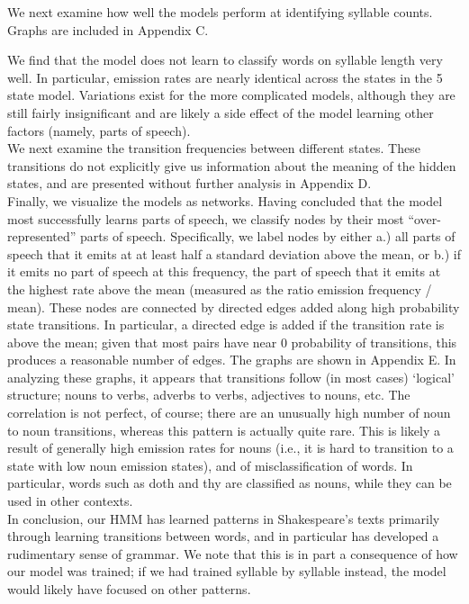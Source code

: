 We next examine how well the models perform at identifying syllable counts. Graphs are included in Appendix C.

We find that the model does not learn to classify words on syllable length very well. In particular, emission rates are nearly identical across the states in the 5 state model. Variations exist for the more complicated models, although they are still fairly insignificant and are likely a side effect of the model learning other factors (namely, parts of speech).\\

We next examine the transition frequencies between different states. These transitions do not explicitly give us information about the meaning of the hidden states, and are presented without further analysis in Appendix D.\\

Finally, we visualize the models as networks. Having concluded that the model most successfully learns parts of speech, we classify nodes by their most ``over-represented'' parts of speech. Specifically, we label nodes by either a.) all parts of speech that it emits at at least half a standard deviation above the mean, or b.) if it emits no part of speech at this frequency, the part of speech that it emits at the highest rate above the mean (measured as the ratio emission frequency / mean). These nodes are connected by directed edges added along high probability state transitions. In particular, a directed edge is added if the transition rate is above the mean; given that most pairs have near 0 probability of transitions, this produces a reasonable number of edges. The graphs are shown in Appendix E.
In analyzing these graphs, it appears that transitions follow (in most cases) `logical' structure; nouns to verbs, adverbs to verbs, adjectives to nouns, etc. The correlation is not perfect, of course; there are an unusually high number of noun to noun transitions, whereas this pattern is actually quite rare. This is likely a result of generally high emission rates for nouns (i.e., it is hard to transition to a state with low noun emission states), and of misclassification of words. In particular, words such as doth and thy are classified as nouns, while they can be used in other contexts.\\

In conclusion, our HMM has learned patterns in Shakespeare's texts primarily through learning transitions between words, and in particular has developed a rudimentary sense of grammar. We note that this is in part a consequence of how our model was trained; if we had trained syllable by syllable instead, the model would likely have focused on other patterns.\\

